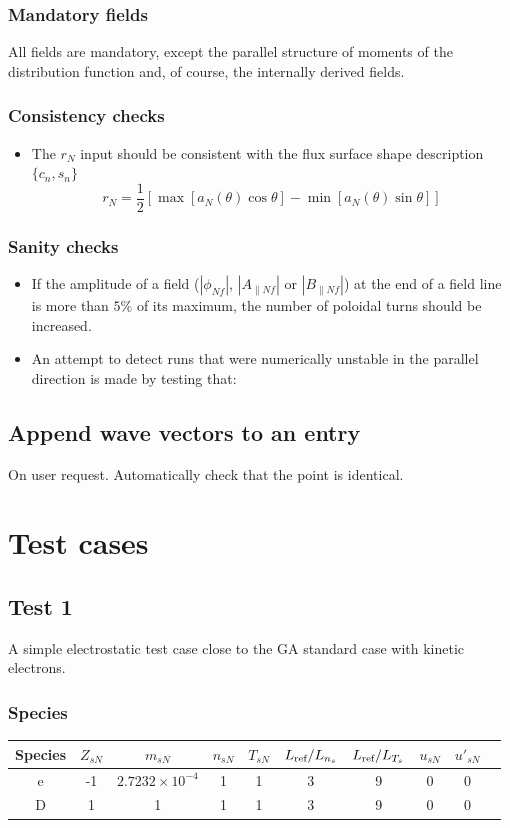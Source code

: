 \documentclass[a4paper]{report}
\begin{document}
\subsection{Mandatory fields}
All fields are mandatory, except the parallel structure of moments of the distribution function and, of course, the internally derived fields. 


\subsection{Consistency checks}
\begin{itemize}
\item The $r_N$ input should be consistent with the flux surface shape description $\{c_n,s_n\}$
$$r_N = \frac{1}{2}\left[\max[a_N(\theta)\cos\theta]-\min[a_N(\theta)\sin\theta]\right]$$

\end{itemize}

\subsection{Sanity checks}
\begin{itemize}
\item If the amplitude of a field ($|\phi_{Nf}|$, $|A_{\parallel Nf}|$ or $|B_{\parallel Nf}|$) at the end of a field line is more than $5\%$ of its maximum, the number of poloidal turns should be increased.
\item An attempt to detect runs that were numerically unstable in the parallel direction is made by testing that: 
\end{itemize}

\section{Append wave vectors to an entry}
On user request. Automatically check that the point is identical.

\chapter{Test cases}

\section{Test 1}
A simple electrostatic test case close to the GA standard case with kinetic electrons.
\subsection{Species}
\begin{tabular}{c c c c c c c c c c}
\hline
Species & $Z_{sN}$ & $m_{sN}$ & $n_{sN}$ & $T_{sN}$ & $L_{\textrm{ref}}/L_{n_s}$ & $L_{\textrm{ref}}/L_{T_s}$ & $u_{sN}$ & $u'_{sN}$ \\ [0.5ex]
\hline
e & -1 & $2.7232\times10^{-4}$ & 1 & 1 & 3 & 9 & 0 & 0 \\ [0.5ex]
\hline 
D &  1 & 1 & 1 & 1 & 3 & 9 & 0 & 0 \\ [0.5ex]
\hline
\end{tabular}
\end{document}
